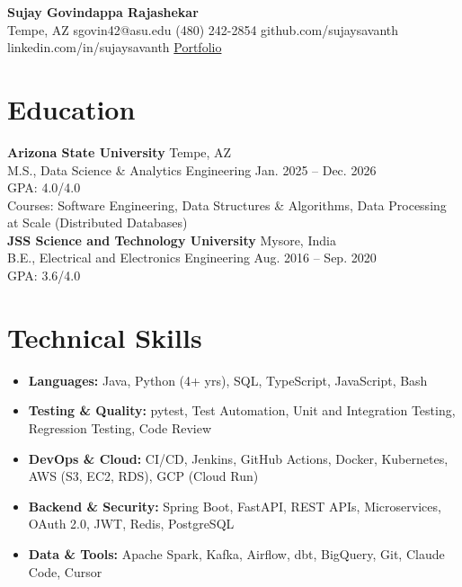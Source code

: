 \documentclass[letterpaper,10pt]{article}
\begin{document}
\begin{center}
{\Large \textbf{Sujay Govindappa Rajashekar}} \\[2pt]
{\small Tempe, AZ \textbar{} sgovin42@asu.edu \textbar{} (480) 242-2854 \textbar{} github.com/sujaysavanth \textbar{} linkedin.com/in/sujaysavanth \textbar{} \href{https://portfolio-sujay11.vercel.app/}{Portfolio}}
\end{center}

\section{Education}
\textbf{Arizona State University} \hfill Tempe, AZ \\
M.S., Data Science \& Analytics Engineering \hfill Jan. 2025 -- Dec. 2026 \\
GPA: 4.0/4.0 \\
{\footnotesize Courses: Software Engineering, Data Structures \& Algorithms, Data Processing at Scale (Distributed Databases)} \\[3pt]
\textbf{JSS Science and Technology University} \hfill Mysore, India \\
B.E., Electrical and Electronics Engineering \hfill Aug. 2016 -- Sep. 2020 \\
GPA: 3.6/4.0

\section{Technical Skills}
\begin{itemize}
\item \textbf{Languages:} Java, Python (4+ yrs), SQL, TypeScript, JavaScript, Bash
\item \textbf{Testing \& Quality:} pytest, Test Automation, Unit and Integration Testing, Regression Testing, Code Review
\item \textbf{DevOps \& Cloud:} CI/CD, Jenkins, GitHub Actions, Docker, Kubernetes, AWS (S3, EC2, RDS), GCP (Cloud Run)
\item \textbf{Backend \& Security:} Spring Boot, FastAPI, REST APIs, Microservices, OAuth 2.0, JWT, Redis, PostgreSQL
\item \textbf{Data \& Tools:} Apache Spark, Kafka, Airflow, dbt, BigQuery, Git, Claude Code, Cursor
\end{itemize}
\end{document}

